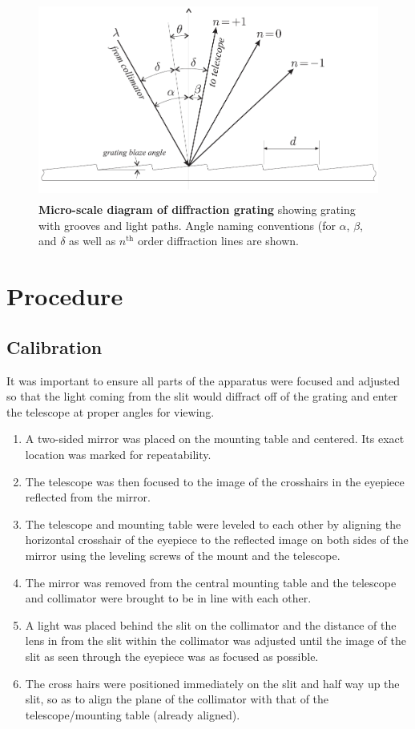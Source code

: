 \documentclass[paper=a4, fontsize=11pt]{scrartcl} %
\numberwithin{equation}{section}
\numberwithin{figure}{section}
\numberwithin{table}{section}
\begin{document}
\begin{figure}[H] \begin{center}
  \includegraphics[height=65mm]{grating1.png}
  \caption{\textbf{Micro-scale diagram of diffraction grating} showing grating with grooves and light paths. Angle naming conventions (for $\alpha$, $\beta$, and $\delta$ as well as $n^\mathrm{th}$ order diffraction lines are shown.}
  \label{fig:diagram1}
\end{center} \end{figure}


\section{Procedure}

\subsection{Calibration}

It was important to ensure all parts of the apparatus were focused and adjusted so that the light coming from the slit would diffract off of the grating and enter the telescope at proper angles for viewing.

\begin{enumerate}
\item A two-sided mirror was placed on the mounting table and centered. Its exact location was marked for repeatability.
\item The telescope was then focused to the image of the crosshairs in
  the eyepiece reflected from the mirror.
\item The telescope and mounting table were leveled to each other by
  aligning the horizontal crosshair of the eyepiece to the reflected
  image on both sides of the mirror using the leveling screws of the
  mount and the telescope.
\item The mirror was removed from the central mounting table and the telescope and collimator were brought to be in line with each other.
\item A light was placed behind the slit on the collimator and the distance of the lens in from the slit within the collimator was adjusted until the image of the slit as seen through the eyepiece was as focused as possible.
\item The cross hairs were positioned immediately on the slit and half way up the slit, so as to align the plane of the collimator with that of the telescope/mounting table (already aligned).
\end{enumerate}
\end{document}
